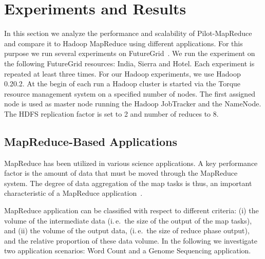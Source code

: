 \documentclass{acm_proc_article-sp}
\newcommand{\upp}{\vspace*{-0.5em}}
\newcommand{\pilotmapreduce}{Pilot-MapReduce\xspace}
\begin{document}
\upp
\section{Experiments and Results}
\label{sec-experiments}


In this section we analyze the performance and scalability of
\pilotmapreduce and compare it to Hadoop MapReduce using different
applications. For this purpose we run several experiments on
FutureGrid~\cite{fg}. We run the experiment on the following
FutureGrid resources: India, Sierra and Hotel. Each experiment is
repeated at least three times. For our Hadoop experiments, we use
Hadoop 0.20.2. At the begin of each run a Hadoop cluster is started
via the Torque resource management system on a specified number of
nodes. The first assigned node is used as master node running the
Hadoop JobTracker and the NameNode. The HDFS replication factor is set
to 2 and number of reduces to 8.
\upp
\subsection{MapReduce-Based Applications}

MapReduce has been utilized in various science applications. A key performance 
factor is the amount of data that must be moved through the MapReduce system. 
The degree of data aggregation of the map tasks is thus, an important 
characteristic of a MapReduce application~\cite{weissman-mr-11}.

MapReduce application can be classified with respect to different
criteria: (i) the volume of the intermediate data (i.\,e.\ the size of
the output of the map tasks), and (ii) the volume of the output data,
(i.\,e.\ the size of reduce phase output), and the relative proportion
of these data volume. In the following we investigate two application
scenarios: Word Count and a Genome Sequencing application.
\end{document}
